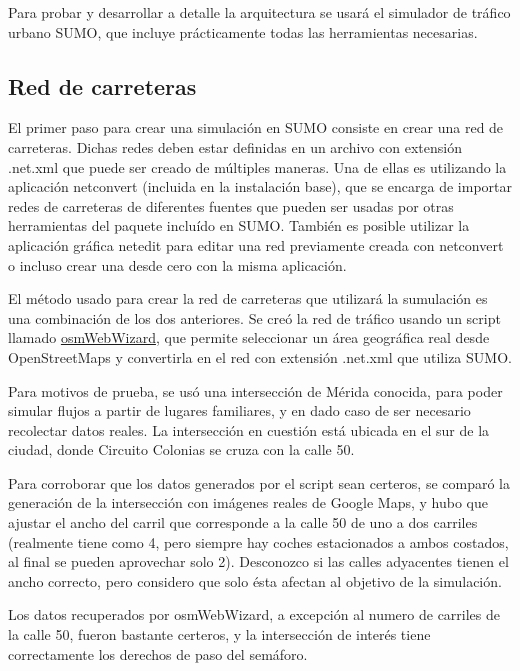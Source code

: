 Para probar y desarrollar a detalle la arquitectura se usará el
simulador de tráfico urbano SUMO, que incluye prácticamente todas las
herramientas necesarias.

\hypertarget{red-de-carreteras}{%
\subsection{Red de carreteras}\label{red-de-carreteras}}

El primer paso para crear una simulación en SUMO consiste en crear una
red de carreteras. Dichas redes deben estar definidas en un archivo con
extensión .net.xml que puede ser creado de múltiples maneras. Una de
ellas es utilizando la aplicación netconvert (incluida en la instalación
base), que se encarga de importar redes de carreteras de diferentes
fuentes que pueden ser usadas por otras herramientas del paquete
incluído en SUMO. También es posible utilizar la aplicación gráfica
netedit para editar una red previamente creada con netconvert o incluso
crear una desde cero con la misma aplicación.

El método usado para crear la red de carreteras que utilizará la
sumulación es una combinación de los dos anteriores. Se creó la red de
tráfico usando un script llamado
\href{https://sumo.dlr.de/docs/Tutorials/OSMWebWizard.html}{osmWebWizard},
que permite seleccionar un área geográfica real desde OpenStreetMaps y
convertirla en el red con extensión .net.xml que utiliza SUMO.

Para motivos de prueba, se usó una intersección de Mérida conocida, para
poder simular flujos a partir de lugares familiares, y en dado caso de
ser necesario recolectar datos reales. La intersección en cuestión está
ubicada en el sur de la ciudad, donde Circuito Colonias se cruza con la
calle 50.

Para corroborar que los datos generados por el script sean certeros, se
comparó la generación de la intersección con imágenes reales de Google
Maps, y hubo que ajustar el ancho del carril que corresponde a la calle
50 de uno a dos carriles (realmente tiene como 4, pero siempre hay
coches estacionados a ambos costados, al final se pueden aprovechar solo
2). Desconozco si las calles adyacentes tienen el ancho correcto, pero
considero que solo ésta afectan al objetivo de la simulación.

Los datos recuperados por osmWebWizard, a excepción al numero de
carriles de la calle 50, fueron bastante certeros, y la intersección de
interés tiene correctamente los derechos de paso del semáforo.

